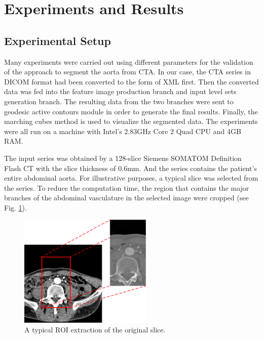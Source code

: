 
\section{Experiments and Results}
\label{sec3_3}

\subsection{Experimental Setup}
Many experiments were carried out using different parameters for the validation of the approach to segment the aorta from CTA.
In our case, the CTA series in DICOM format had been converted to the form of XML first.
Then the converted data was fed into the feature image production branch and input level sets generation branch.
The resulting data from the two branches were sent to geodesic active contours module in order to generate the final results.
Finally, the marching cubes method is used to visualize the segmented data.
The experiments were all run on a machine with Intel's 2.83GHz Core 2 Quad CPU and 4GB RAM.

The input series was obtained by a 128-slice Siemens SOMATOM Definition Flash CT with the slice thickness of 0.6mm.
And the series contains the patient's entire abdominal aorta.
For illustrative purposes, a typical slice was selected from the series.
To reduce the computation time, the region that contains the major branches of the abdominal vasculature in the selected image were cropped (see Fig. \ref{fig_roi}).
\begin{figure}[t]
\centering
\includegraphics[width=2.5in]{figures/chap03/ROI.eps}
\caption{A typical ROI extraction of the original slice.}
\label{fig_roi}
\end{figure}

